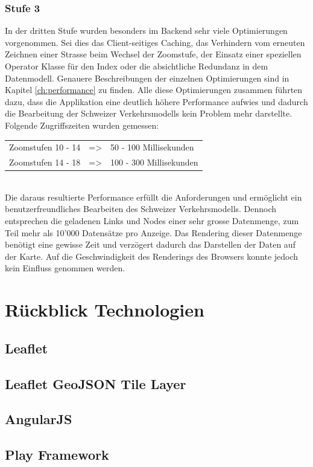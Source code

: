 \subsubsection*{Stufe 3}
In der dritten Stufe wurden besonders im Backend sehr viele Optimierungen vorgenommen. Sei dies das Client-seitiges Caching, das Verhindern vom erneuten Zeichnen einer Strasse beim Wechsel der Zoomstufe, der Einsatz einer speziellen Operator Klasse für den Index oder die absichtliche Redundanz in dem Datenmodell. Genauere Beschreibungen der einzelnen Optimierungen sind in Kapitel \ref{ch:performance}  zu finden. Alle diese Optimierungen zusammen führten dazu, dass die Applikation eine deutlich höhere Performance aufwies und dadurch die Bearbeitung der Schweizer Verkehrsmodells kein Problem mehr darstellte.\\
Folgende Zugriffszeiten wurden gemessen:\\[0.3cm]
\begin{tabular}{ l c l}
Zoomstufen 10 - 14 & => & 50 - 100 Millisekunden \\
Zoomstufen 14 - 18 & => & 100 - 300 Millisekunden \\ 
\end{tabular}\\[0.3cm]
Die daraus resultierte Performance erfüllt die Anforderungen und ermöglicht ein benutzerfreundliches Bearbeiten des Schweizer Verkehrsmodells. Dennoch entsprechen die geladenen Links und Nodes einer sehr grosse Datenmenge, zum Teil mehr als 10'000 Datensätze pro Anzeige. Das Rendering dieser Datenmenge benötigt eine gewisse Zeit und verzögert dadurch das Darstellen der Daten auf der Karte. Auf die Geschwindigkeit des Renderings des Browsers konnte jedoch kein Einfluss genommen werden.
\section{Rückblick Technologien}
\subsection*{Leaflet}
\subsection*{Leaflet GeoJSON Tile Layer}
\subsection*{AngularJS}
\subsection*{Play Framework}
